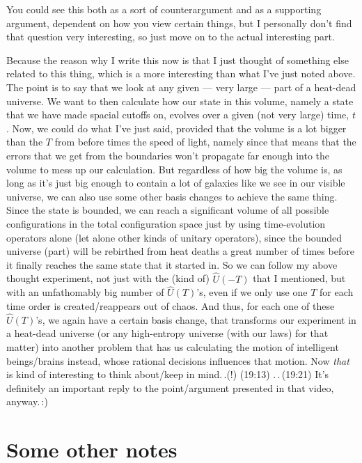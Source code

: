 \documentclass{report}
\begin{document}
You could see this both as a sort of counterargument and as a supporting argument, dependent on how you view certain things, but I personally don't find that question very interesting, so just move on to the actual interesting part.

Because the reason why I write this now is that I just thought of something else related to this thing, which is a more interesting than what I've just noted above. The point is to say that we look at any given --- very large --- part of a heat-dead universe. We want to then calculate how our state in this volume, namely a state that we have made spacial cutoffs on, evolves over a given (not very large) time, $t$. Now, we could do what I've just said, provided that the volume is a lot bigger than the $T$ from before times the speed of light, namely since that means that the errors that we get from the boundaries won't propagate far enough into the volume to mess up our calculation. But regardless of how big the volume is, as long as it's just big enough to contain a lot of galaxies like we see in our visible universe, we can also use some other basis changes to achieve the same thing. Since the state is bounded, we can reach a significant volume of all possible configurations in the total configuration space just by using time-evolution operators alone (let alone other kinds of unitary operators), since the bounded universe (part) will be rebirthed from heat deaths a great number of times before it finally reaches the same state that it started in. So we can follow my above thought experiment, not just with the (kind of) $\hat U (-T)$ that I mentioned, but with an unfathomably big number of $\hat U (T)$'s, even if we only use one $T$ for each time order is created/reappears out of chaos. And thus, for each one of these $\hat U (T)$'s, we again have a certain basis change, that transforms our experiment in a heat-dead universe (or any high-entropy universe (with our laws) for that matter) into another problem that has us calculating the motion of intelligent beings/brains instead, whose rational decisions influences that motion. Now \emph{that} is kind of interesting to think about/keep in mind.\,.(!) (19:13) .\,.\,(19:21) It's definitely an important reply to the point/argument presented in that video, anyway.\,:)




\section{Some other notes}
\end{document}
